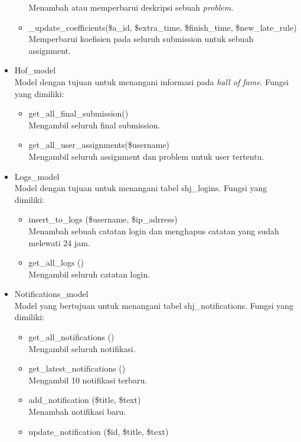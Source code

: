 \begin{itemize}
\begin{itemize}
 Menambah atau memperbarui deskripsi sebuah \textit{problem}.
 \item \_update\_coefficients(\$a\_id, \$extra\_time, \$finish\_time, \$new\_late\_rule)\\
 Memperbarui koefisien pada seluruh submission untuk sebuah assignment.
    \end{itemize}
    \item Hof\_model\\
    Model dengan tujuan untuk menangani informasi pada \textit{hall of fame}. Fungsi yang dimiliki:
    \begin{itemize}
        \item get\_all\_final\_submission()\\
 Mengambil seluruh final submission.
        \item get\_all\_user\_assignments(\$username)\\
 Mengambil seluruh assignment dan problem untuk user tertentu. 
    \end{itemize}
    \item Logs\_model \\
 Model dengan tujuan untuk menangani tabel shj\_logins. Fungsi yang dimiliki:
    \begin{itemize}
        \item insert\_to\_logs (\$username, \$ip\_adrress) \\
 Menambah sebuah catatan login dan menghapus catatan yang sudah melewati 24 jam.
        \item get\_all\_logs ()\\
 Mengambil seluruh catatan login.
    \end{itemize}
    \item Notifications\_model\\
 Model yang bertujuan untuk menangani tabel shj\_notifications. Fungsi yang dimiliki:
    \begin{itemize}
        \item get\_all\_notifications ()\\
 Mengambil seluruh notifikasi.
        \item get\_latest\_notifications ()\\
        Mengambil 10 notifikasi terbaru.
        \item add\_notification (\$title, \$text)\\
 Menambah notifikasi baru.
        \item update\_notification (\$id, \$title, \$text) \\

\end{itemize}
\end{itemize}
